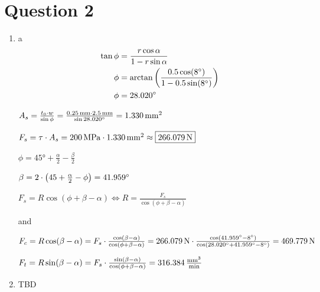 \documentclass[11pt,letterpaper]{article}
\begin{document}
\clearpage

\section*{Question 2}
\begin{enumerate}[label=(\alph*), leftmargin=2.5em, itemsep=0.8em, topsep=0.5em]

\item a
\edef\shearAngle{\fpeval{atand((0.5 * cosd(8)) / (1 - 0.5 * sind(8)))}}
\[
\begin{aligned}
\tan{\phi} &= \frac{r \cos \alpha}{1 - r \sin \alpha}\\
\phi &= \arctan \left(\frac{0.5 \cos( \ang{8})}{1-0.5 \sin( \ang{8})}\right)\\
\phi &= \ang[round-mode=places, round-precision=3]{\shearAngle}
\end{aligned}
\]


\edef\shearArea{\fpeval{(0.25 * 2.5) / sind(\shearAngle)}}
$ A_s = \frac{t_0 \cdot w}{\sin \phi} = \frac{\qty{0.25}{mm} \cdot \qty{2.5}{mm}}{\sin \ang[round-mode=places, round-precision=3]{\shearAngle}} = \qty[round-mode=places, round-precision=3]{\shearArea}{mm^2}$

\edef\shearForce{\fpeval{200 * \shearArea}}
$ F_s = \tau \cdot A_s = \qty{200}{MPa} \cdot \qty[round-mode=places, round-precision=3]{\shearArea}{mm^2} \approx \boxed{\qty[round-mode=places, round-precision=3]{\shearForce}{N}}$

$ \phi = \ang{45} + \frac{\alpha}{2} - \frac{\beta}{2} $

\edef\angleBeta{\fpeval{2*(45 + 8/2 - \shearAngle)}}
$ \beta = 2 \cdot \left(45 + \frac{\alpha}{2} - \phi \right) = \ang[round-mode=places, round-precision=3]{\angleBeta}$

$ F_s = R \cos (\phi + \beta - \alpha) \iff R = \frac{F_s}{\cos (\phi + \beta - \alpha)} $

and


\edef\cuttingForce{\fpeval{\shearForce * cosd(\angleBeta - 8) / cosd(\shearAngle + \angleBeta - 8)}}
$ F_c = R \cos (\beta - \alpha) = F_s \cdot \frac{\cos (\beta - \alpha)}{\cos (\phi + \beta - \alpha)} = \qty[round-mode=places, round-precision=3]{\shearForce}{N} \cdot \frac{\cos (\ang[round-mode=places, round-precision=3]{\angleBeta} - \ang{8})}{\cos (\ang[round-mode=places, round-precision=3]{\shearAngle} + \ang[round-mode=places, round-precision=3]{\angleBeta} - \ang{8})} = \qty[round-mode=places, round-precision=3]{\cuttingForce}{N}$ 


\edef\thrustForce{\fpeval{\shearForce * sind(\angleBeta - 8) / cosd(\shearAngle + \angleBeta - 8)}}
$ F_t = R \sin (\beta - \alpha) = F_s \cdot \frac{\sin (\beta - \alpha)}{\cos (\phi + \beta - \alpha)} = \qty[round-mode=places, round-precision=3]{\thrustForce}{\frac{mm^3}{min}}$

\item TBD
\end{enumerate}
\clearpage
\end{document}
